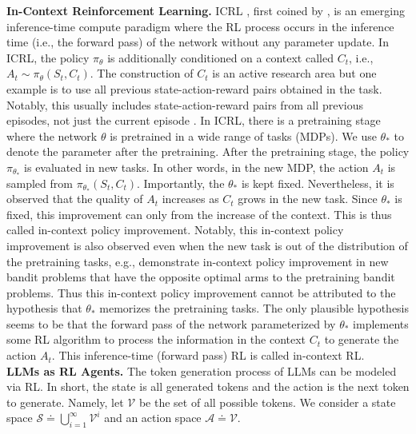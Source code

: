 \documentclass{article} %
\newcommand{\fS}{\mathcal{S}}
\newcommand{\fA}{\mathcal{A}}
\newcommand{\fV}{\mathcal{V}}
\newcommand{\0}{\mathbf{0}}
\begin{document}



\textbf{In-Context Reinforcement Learning.} ICRL \citep{moeini2025survey}, first coined by \citet{laskin2023incontext}, is an emerging inference-time compute paradigm where the RL process occurs in the inference time (i.e., the forward pass) of the network without any parameter update.
In ICRL, the policy $\pi_\theta$ is additionally conditioned on a context called $C_t$, i.e., $A_t \sim \pi_\theta(S_t, C_t)$.
The construction of $C_t$ is an active research area but one example is to use all previous state-action-reward pairs obtained in the task.
Notably, this usually includes state-action-reward pairs from all previous episodes, not just the current episode \citep{laskin2023incontext}.
In ICRL,
there is a pretraining stage where the network $\theta$ is pretrained in a wide range of tasks (MDPs).
We use $\theta_*$ to denote the parameter after the pretraining.
After the pretraining stage,
the policy $\pi_{\theta_*}$ is evaluated in new tasks.
In other words,
in the new MDP, the action $A_t$ is sampled from $\pi_{\theta_*}(S_t, C_t)$.
Importantly, the $\theta_*$ is kept fixed.
Nevertheless, 
it is observed that the quality of $A_t$ increases as $C_t$ grows in the new task.
Since $\theta_*$ is fixed,
this improvement can only from the increase of the context.
This is thus called in-context policy improvement.
Notably,
this in-context policy improvement is also observed even when the new task is out of the distribution of the pretraining tasks, 
e.g.,
\citet{laskin2023incontext} demonstrate in-context policy improvement in new bandit problems that have the opposite optimal arms to the pretraining bandit problems.
Thus this in-context policy improvement cannot be attributed to the hypothesis that $\theta_*$ memorizes the pretraining tasks.
The only plausible hypothesis seems to be that the forward pass of the network parameterized by $\theta_*$ implements some RL algorithm to process the information in the context $C_t$ to generate the action $A_t$.
This inference-time (forward pass) RL is called in-context RL. \\
\textbf{LLMs as RL Agents.} The token generation process of LLMs can be modeled via RL.
In short, the state is all generated tokens and the action is the next token to generate. 
Namely,
let $\fV$ be the set of all possible tokens.
We consider a state space $\fS \doteq \bigcup_{i=1}^\infty \fV^i$ and an action space $\fA \doteq \fV$.
\end{document}
